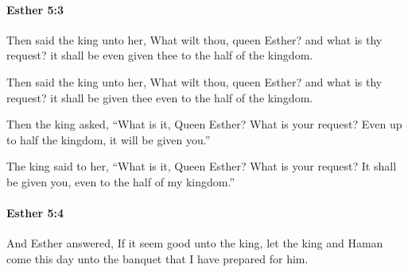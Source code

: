 		\paragraph{Esther 5:3} %
			\label{ESTHER-5-3}

			Then said the king unto her, What wilt thou, queen Esther? and what is thy request? it shall be even given thee to the half of the kingdom.

			\begin{versebox}
					\item[BHS] 
					\item[LXX] 
					\item[ASV] Then said the king unto her, What wilt thou, queen Esther? and what is thy request? it shall be given thee even to the half of the kingdom.
					\item[NIV] Then the king asked, “What is it, Queen Esther? What is your request? Even up to half the kingdom, it will be given you.”
					\item[NRSV] The king said to her, “What is it, Queen Esther? What is your request? It shall be given you, even to the half of my kingdom.”
			\end{versebox}

		\paragraph{Esther 5:4} %
			\label{ESTHER-5-4}

			And Esther answered, If it seem good unto the king, let the king and Haman come this day unto the banquet that I have prepared for him.

